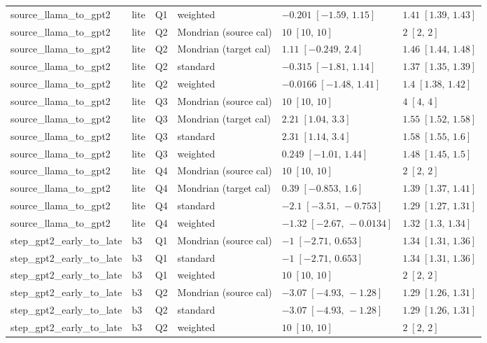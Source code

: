 \begin{longtable}{@{}p{}p{}p{}p{}p{}p{}@{}}
source\_llama\_to\_gpt2 & lite & Q1 & weighted & $-0.201\;[-1.59,\,1.15]$ & $1.41\;[1.39,\,1.43]$ \\
source\_llama\_to\_gpt2 & lite & Q2 & Mondrian (source cal) & $10\;[10,\,10]$ & $2\;[2,\,2]$ \\
source\_llama\_to\_gpt2 & lite & Q2 & Mondrian (target cal) & $1.11\;[-0.249,\,2.4]$ & $1.46\;[1.44,\,1.48]$ \\
source\_llama\_to\_gpt2 & lite & Q2 & standard & $-0.315\;[-1.81,\,1.14]$ & $1.37\;[1.35,\,1.39]$ \\
source\_llama\_to\_gpt2 & lite & Q2 & weighted & $-0.0166\;[-1.48,\,1.41]$ & $1.4\;[1.38,\,1.42]$ \\
source\_llama\_to\_gpt2 & lite & Q3 & Mondrian (source cal) & $10\;[10,\,10]$ & $4\;[4,\,4]$ \\
source\_llama\_to\_gpt2 & lite & Q3 & Mondrian (target cal) & $2.21\;[1.04,\,3.3]$ & $1.55\;[1.52,\,1.58]$ \\
source\_llama\_to\_gpt2 & lite & Q3 & standard & $2.31\;[1.14,\,3.4]$ & $1.58\;[1.55,\,1.6]$ \\
source\_llama\_to\_gpt2 & lite & Q3 & weighted & $0.249\;[-1.01,\,1.44]$ & $1.48\;[1.45,\,1.5]$ \\
source\_llama\_to\_gpt2 & lite & Q4 & Mondrian (source cal) & $10\;[10,\,10]$ & $2\;[2,\,2]$ \\
source\_llama\_to\_gpt2 & lite & Q4 & Mondrian (target cal) & $0.39\;[-0.853,\,1.6]$ & $1.39\;[1.37,\,1.41]$ \\
source\_llama\_to\_gpt2 & lite & Q4 & standard & $-2.1\;[-3.51,\,-0.753]$ & $1.29\;[1.27,\,1.31]$ \\
source\_llama\_to\_gpt2 & lite & Q4 & weighted & $-1.32\;[-2.67,\,-0.0134]$ & $1.32\;[1.3,\,1.34]$ \\
step\_gpt2\_early\_to\_late & b3 & Q1 & Mondrian (source cal) & $-1\;[-2.71,\,0.653]$ & $1.34\;[1.31,\,1.36]$ \\
step\_gpt2\_early\_to\_late & b3 & Q1 & standard & $-1\;[-2.71,\,0.653]$ & $1.34\;[1.31,\,1.36]$ \\
step\_gpt2\_early\_to\_late & b3 & Q1 & weighted & $10\;[10,\,10]$ & $2\;[2,\,2]$ \\
step\_gpt2\_early\_to\_late & b3 & Q2 & Mondrian (source cal) & $-3.07\;[-4.93,\,-1.28]$ & $1.29\;[1.26,\,1.31]$ \\
step\_gpt2\_early\_to\_late & b3 & Q2 & standard & $-3.07\;[-4.93,\,-1.28]$ & $1.29\;[1.26,\,1.31]$ \\
step\_gpt2\_early\_to\_late & b3 & Q2 & weighted & $10\;[10,\,10]$ & $2\;[2,\,2]$ \\

\end{longtable}
